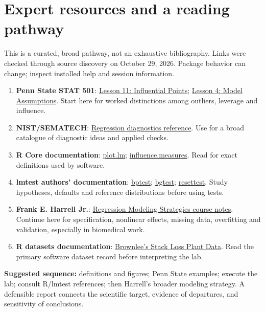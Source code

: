 \documentclass[11pt]{article}
\begin{document}
\section{Expert resources and a reading pathway}
This is a curated, broad pathway, not an exhaustive bibliography. Links were checked through source discovery on October 29, 2026. Package behavior can change; inspect installed help and session information.
\begin{enumerate}
\item \textbf{Penn State STAT 501}: \href{https://online.stat.psu.edu/stat501/Lesson11}{Lesson 11: Influential Points}; \href{https://online.stat.psu.edu/stat501/Lesson04}{Lesson 4: Model Assumptions}. Start here for worked distinctions among outliers, leverage and influence.
\item \textbf{NIST/SEMATECH}: \href{https://www.itl.nist.gov/div898/software/dataplot/refman1/auxillar/regrdiag.htm}{Regression diagnostics reference}. Use for a broad catalogue of diagnostic ideas and applied checks.
\item \textbf{R Core documentation}: \href{https://stat.ethz.ch/R-manual/R-devel/library/stats/html/plot.lm.html}{plot.lm}; \href{https://stat.ethz.ch/R-manual/R-devel/library/stats/html/influence.measures.html}{influence.measures}. Read for exact definitions used by software.
\item \textbf{lmtest authors' documentation}: \href{https://search.r-project.org/CRAN/refmans/lmtest/help/bptest.html}{bptest}; \href{https://search.r-project.org/CRAN/refmans/lmtest/html/bgtest.html}{bgtest}; \href{https://search.r-project.org/CRAN/refmans/lmtest/help/resettest.html}{resettest}. Study hypotheses, defaults and reference distributions before using tests.
\item \textbf{Frank E. Harrell Jr.}: \href{https://hbiostat.org/rmsc/}{Regression Modeling Strategies course notes}. Continue here for specification, nonlinear effects, missing data, overfitting and validation, especially in biomedical work.
\item \textbf{R datasets documentation}: \href{https://stat.ethz.ch/R-manual/R-devel/library/datasets/html/stackloss.html}{Brownlee's Stack Loss Plant Data}. Read the primary software dataset record before interpreting the lab.
\end{enumerate}
\textbf{Suggested sequence:} definitions and figures; Penn State examples; execute the lab; consult R/lmtest references; then Harrell's broader modeling strategy. A defensible report connects the scientific target, evidence of departures, and sensitivity of conclusions.
\end{document}
